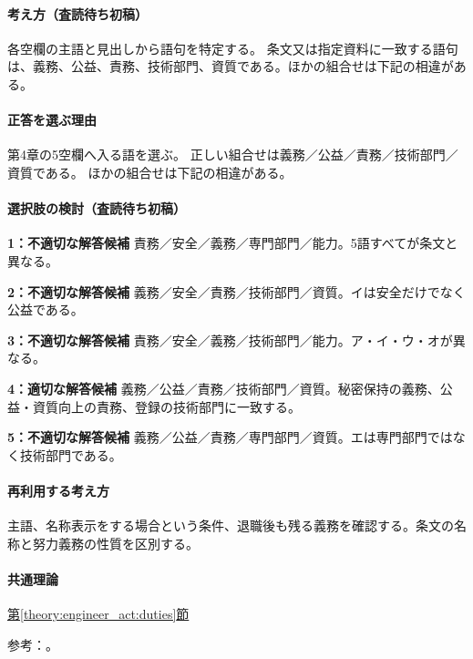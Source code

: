 \paragraph{考え方（査読待ち初稿）} 各空欄の主語と見出しから語句を特定する。 条文又は指定資料に一致する語句は、義務、公益、責務、技術部門、資質である。ほかの組合せは下記の相違がある。

\paragraph{正答を選ぶ理由} 第4章の5空欄へ入る語を選ぶ。 正しい組合せは義務／公益／責務／技術部門／資質である。 ほかの組合せは下記の相違がある。

\paragraph{選択肢の検討（査読待ち初稿）}

\noindent\textbf{1：不適切な解答候補} 責務／安全／義務／専門部門／能力。5語すべてが条文と異なる。\par

\noindent\textbf{2：不適切な解答候補} 義務／安全／責務／技術部門／資質。イは安全だけでなく公益である。\par

\noindent\textbf{3：不適切な解答候補} 責務／安全／義務／技術部門／能力。ア・イ・ウ・オが異なる。\par

\noindent\textbf{4：適切な解答候補} 義務／公益／責務／技術部門／資質。秘密保持の義務、公益・資質向上の責務、登録の技術部門に一致する。\par

\noindent\textbf{5：不適切な解答候補} 義務／公益／責務／専門部門／資質。エは専門部門ではなく技術部門である。\par

\paragraph{再利用する考え方} 主語、名称表示をする場合という条件、退職後も残る義務を確認する。条文の名称と努力義務の性質を区別する。

\paragraph{共通理論} \hyperref[theory:engineer_act:duties]{第\ref*{theory:engineer_act:duties}節}

\par 参考：\cite{engineer_act_current}。

